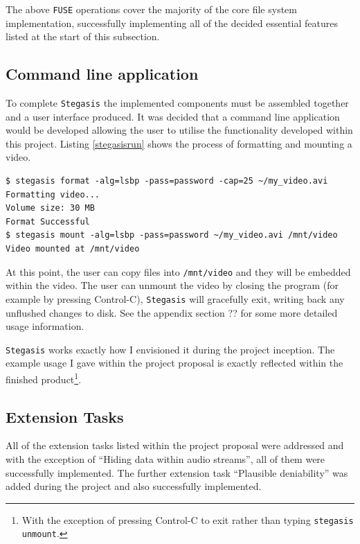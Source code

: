 \documentclass[paper=a4, fontsize=11pt,twoside]{scrartcl}    %
\numberwithin{table}{section}
\numberwithin{figure}{section}
\numberwithin{algorithm}{section}
\begin{document}
\noindent
The above \texttt{FUSE} operations cover the majority of the core file system implementation, successfully implementing all of the decided essential features listed at the start of this subsection.

\subsection{Command line application}

To complete \texttt{Stegasis} the implemented components must be assembled together and a user interface produced. It was decided that a command line application would be developed allowing the user to utilise the functionality developed within this project. Listing \ref{stegasisrun} shows the process of formatting and mounting a video.

\begin{lstlisting}[caption={Using \texttt{Stagasis} to format and mount a video.}, frame=single, label=stegasisrun]
$ stegasis format -alg=lsbp -pass=password -cap=25 ~/my_video.avi
Formatting video...
Volume size: 30 MB
Format Successful
$ stegasis mount -alg=lsbp -pass=password ~/my_video.avi /mnt/video
Video mounted at /mnt/video
\end{lstlisting}

At this point, the user can copy files into \texttt{/mnt/video} and they will be embedded within the video. The user can unmount the video by closing the program (for example by pressing Control-C), \texttt{Stegasis} will gracefully exit, writing back any unflushed changes to disk. See the appendix section ?? for some more detailed usage information.

\texttt{Stegasis} works exactly how I envisioned it during the project inception. The example usage I gave within the project proposal is exactly reflected within the finished product\footnote{With the exception of pressing Control-C to exit rather than typing \texttt{stegasis unmount}.}.

\subsection{Extension Tasks}

All of the extension tasks listed within the project proposal were addressed and with the exception of ``Hiding data within audio streams'', all of them were successfully implemented. The further extension task ``Plausible deniability'' was added during the project and also successfully implemented.
\end{document}
